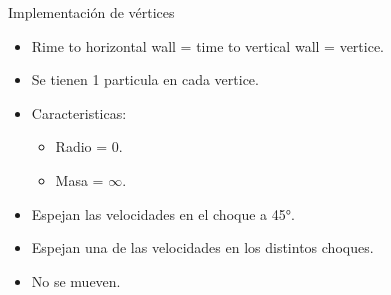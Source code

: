 \documentclass{beamer}
\begin{document}
\begin{frame}{Implementación de vértices}
  \begin{itemize}
    \item Rime to horizontal wall = time to vertical wall = vertice.
    \item Se tienen 1 particula en cada vertice.
    \item Caracteristicas:
      \begin{itemize}
        \item Radio = 0.
        \item Masa = $\infty$.
      \end{itemize}
    \item Espejan las velocidades en el choque a 45°.
    \item Espejan una de las velocidades en los distintos choques.
    \item No se mueven.
  \end{itemize}
\end{frame}

\end{document}

